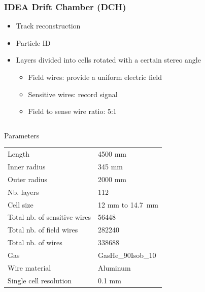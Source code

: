 \documentclass[hyperref={colorlinks=true,pdfpagelabels=false,linkcolor=black}, xcolor=dvipsnames,10pt]{beamer}
\begin{document}
\begin{frame}
\end{frame}

\begin{frame}
	\frametitle{IDEA Drift Chamber (DCH)}
	

	\begin{itemize}
	\item Track reconstruction
	\item Particle ID
	\item Layers divided into cells rotated with a certain stereo angle
		\begin{itemize}
		\item Field wires: provide a uniform electric field
		\item Sensitive wires: record signal
		\item Field to sense wire ratio: 5:1
		\end{itemize}
	\end{itemize}		
	
	\begin{columns}	
		\begin{block}{Parameters}
  \begin{table}
    \begin{adjustbox}{max width=\textwidth}
      \begin{tabular}{l l}
        \toprule
        Length & 4500 mm \\ 
        Inner radius & 345 mm \\
        Outer radius & 2000 mm\\
        Nb. layers & 112 \\
        Cell size & 12 mm to 14.7~mm\\
        Total nb. of sensitive wires & 56448 \\
        Total nb. of field wires & 282240 \\
        Total nb. of wires & 338688 \\
        Gas & GasHe\_90Isob\_10 \\
        Wire material & Aluminum \\
        Single cell resolution & 0.1 mm \\
        \bottomrule
      \end{tabular}
    \end{adjustbox}
  \end{table}
		\end{block}



\end{columns}
\end{frame}
\end{document}
